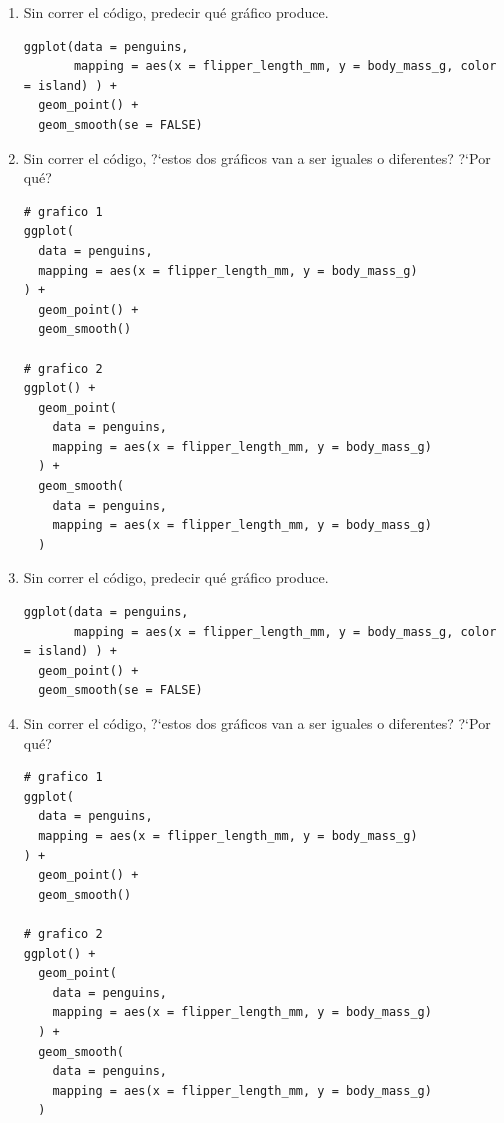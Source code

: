 \documentclass[a4paper,11pt]{article}
\theoremstyle{definition}
\begin{document}
\begin{enumerate}[resume]
\item Sin correr el c\'odigo, predecir qu\'e gr\'afico produce.
\begin{lstlisting}
ggplot(data = penguins,
       mapping = aes(x = flipper_length_mm, y = body_mass_g, color = island) ) +
  geom_point() +
  geom_smooth(se = FALSE)
\end{lstlisting}

\item Sin correr el c\'odigo, ?`estos dos gr\'aficos van a ser iguales o diferentes? ?`Por qu\'e?
\begin{lstlisting}
# grafico 1
ggplot(
  data = penguins,
  mapping = aes(x = flipper_length_mm, y = body_mass_g)
) +
  geom_point() +
  geom_smooth()

# grafico 2
ggplot() +
  geom_point(
    data = penguins,
    mapping = aes(x = flipper_length_mm, y = body_mass_g)
  ) +
  geom_smooth(
    data = penguins,
    mapping = aes(x = flipper_length_mm, y = body_mass_g)
  )
\end{lstlisting}

\item Sin correr el c\'odigo, predecir qu\'e gr\'afico produce.
\begin{lstlisting}
ggplot(data = penguins,
       mapping = aes(x = flipper_length_mm, y = body_mass_g, color = island) ) +
  geom_point() +
  geom_smooth(se = FALSE)
\end{lstlisting}

\item Sin correr el c\'odigo, ?`estos dos gr\'aficos van a ser iguales o diferentes? ?`Por qu\'e?
\begin{lstlisting}
# grafico 1
ggplot(
  data = penguins,
  mapping = aes(x = flipper_length_mm, y = body_mass_g)
) +
  geom_point() +
  geom_smooth()

# grafico 2
ggplot() +
  geom_point(
    data = penguins,
    mapping = aes(x = flipper_length_mm, y = body_mass_g)
  ) +
  geom_smooth(
    data = penguins,
    mapping = aes(x = flipper_length_mm, y = body_mass_g)
  )
\end{lstlisting}

\end{enumerate}
\end{document}
